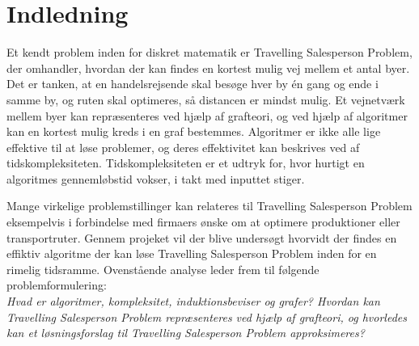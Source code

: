 \chapter{Indledning}
Et kendt problem inden for diskret matematik er Travelling Salesperson Problem, der omhandler, hvordan der kan findes en kortest mulig vej mellem et antal byer. 
Det er tanken, at en handelsrejsende skal besøge hver by én gang og ende i samme by, og ruten skal optimeres, så distancen er mindst mulig. 
Et vejnetværk mellem byer kan repræsenteres ved hjælp af grafteori, og ved hjælp af algoritmer kan en kortest mulig kreds i en graf bestemmes. 
Algoritmer er ikke alle lige effektive til at løse problemer, og deres effektivitet kan beskrives ved af tidskompleksiteten. 
Tidskompleksiteten er et udtryk for, hvor hurtigt en algoritmes gennemløbstid vokser, i takt med inputtet stiger. 

Mange virkelige problemstillinger kan relateres til Travelling Salesperson Problem eksempelvis i forbindelse med firmaers ønske om at optimere produktioner eller transportruter. 
Gennem projeket vil der blive undersøgt hvorvidt der findes en effiktiv algoritme der kan løse Travelling Salesperson Problem inden for en rimelig tidsramme.
Ovenstående analyse leder frem til følgende problemformulering:\\

\textit{Hvad er algoritmer, kompleksitet, induktionsbeviser og grafer? Hvordan kan Travelling Salesperson Problem repræsenteres ved hjælp af grafteori, og hvorledes kan et løsningsforslag til Travelling Salesperson Problem approksimeres?}
